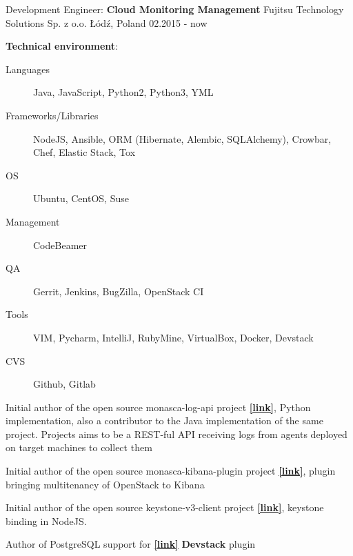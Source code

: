 
\begin{cventries}

  \cventry
  {Development Engineer: \textbf{Cloud Monitoring Management}}
  {Fujitsu Technology Solutions Sp. z o.o.}
  {Łódź, Poland}
  {02.2015 - now}
  {
    \begin{cvitems}
      \item[]{
        \textbf{Technical environment}:
        \begin{description}
            \item[Languages] Java, JavaScript, Python2, Python3, YML
            \item[Frameworks/Libraries] NodeJS, Ansible, ORM (Hibernate, Alembic, SQLAlchemy), Crowbar, Chef, Elastic Stack, Tox
            \item[OS] Ubuntu, CentOS, Suse
            \item[Management] CodeBeamer
            \item[QA] Gerrit, Jenkins, BugZilla, OpenStack CI
            \item[Tools] VIM, Pycharm, IntelliJ, RubyMine, VirtualBox, Docker, Devstack
            \item[CVS] \faGithub\acvHeaderIconSep Github, \faGitlab\acvHeaderIconSep Gitlab
        \end{description}
      }
      \item{Initial author of the open source monasca-log-api project
              \href{https://github.com/openstack/monasca-log-api}{\textbf{[\faGithubSquare\acvHeaderIconSep link]}},
          Python implementation, also a contributor to the Java implementation
          of the same project. Projects aims to be a REST-ful
          API receiving logs from agents deployed on target machines to collect them
      }
      \item{Initial author of the open source monasca-kibana-plugin
          project \href{https://github.com/openstack/monasca-kibana-plugin}{\textbf{[\faGithubSquare\acvHeaderIconSep link]}},
          plugin bringing multitenancy of OpenStack to Kibana
      }
      \item{Initial author of the open source keystone-v3-client project
          \href{https://github.com/FujitsuEnablingSoftwareTechnologyGmbH/keystone-v3-client}{\textbf{[\faGithubSquare\acvHeaderIconSep link]}}, keystone binding in NodeJS.
      }
      \item{Author of PostgreSQL support for
          \href{https://github.com/openstack/monasca-api}{\textbf{[\faGithubSquare\acvHeaderIconSep link]}} \textbf{Devstack} plugin}

\end{cvitems}}
\end{cventries}
